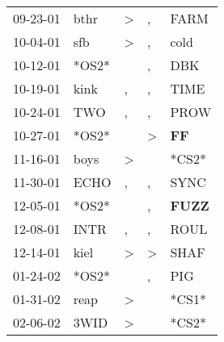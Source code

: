 \begin{supertabular}{p{0.07\textwidth}p{0.06\textwidth}p{0.02\textwidth}p{0.02\textwidth}p{0.06\textwidth}}
          09-23-01\textsuperscript{} &           bthr\textsuperscript{} &     \textgreater &                , &           FARM\textsuperscript{} \\
          10-04-01\textsuperscript{} &            sfb\textsuperscript{} &     \textgreater &                , &           cold\textsuperscript{} \\
          10-12-01\textsuperscript{} &                            *OS2* &                  &                , &            DBK\textsuperscript{} \\
          10-19-01\textsuperscript{} &           kink\textsuperscript{} &                , &                , &           TIME\textsuperscript{} \\
          10-24-01\textsuperscript{} &            TWO\textsuperscript{} &                , &                , &           PROW\textsuperscript{} \\
          10-27-01\textsuperscript{} &                            *OS2* &                  &     \textgreater &    \textbf{FF\textsuperscript{}} \\
          11-16-01\textsuperscript{} &           boys\textsuperscript{} &     \textgreater &                  &                            *CS2* \\
          11-30-01\textsuperscript{} &           ECHO\textsuperscript{} &                , &                , &           SYNC\textsuperscript{} \\
          12-05-01\textsuperscript{} &                            *OS2* &                  &                , &  \textbf{FUZZ\textsuperscript{}} \\
          12-08-01\textsuperscript{} &           INTR\textsuperscript{} &                , &                , &           ROUL\textsuperscript{} \\
          12-14-01\textsuperscript{} &           kiel\textsuperscript{} &     \textgreater &     \textgreater &           SHAF\textsuperscript{} \\
          01-24-02\textsuperscript{} &                            *OS2* &                  &                , &            PIG\textsuperscript{} \\
          01-31-02\textsuperscript{} &           reap\textsuperscript{} &     \textgreater &                  &                            *CS1* \\
          02-06-02\textsuperscript{} &           3WID\textsuperscript{} &     \textgreater &                  &                            *CS2* \\

\end{supertabular}
